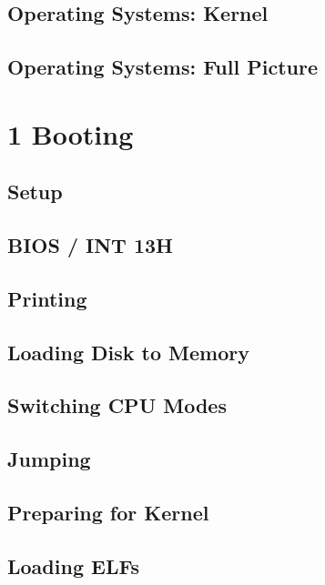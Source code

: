 \documentclass[openany, 12px]{book}
\begin{document}
\section{Operating Systems: Kernel}


\section{Operating Systems: Full Picture}


\clearpage


\newpage
\chapter*{1 Booting}
\setcounter{section}{-1}

\section{Setup}

\section{BIOS / INT 13H}

\section{Printing}

\section{Loading Disk to Memory}

\section{Switching CPU Modes}

\section{Jumping}

\section{Preparing for Kernel}

\section{Loading ELFs}

\clearpage
\end{document}

